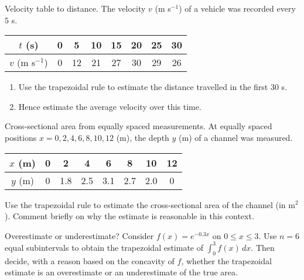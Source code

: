 \documentclass[11pt]{article}
\def\textbf#1{#1}%
\newcounter{question}
\begin{document}
\begin{question}
\textbf{Velocity table to distance.}
The velocity \(v\) (m s\(^{-1}\)) of a vehicle was recorded every \(5\) s.

\begin{center}
\begin{tabular}{c|ccccccc}
\(t\) (s) & 0 & 5 & 10 & 15 & 20 & 25 & 30\\\hline
\(v\) (m s\(^{-1}\)) & 0 & 12 & 21 & 27 & 30 & 29 & 26
\end{tabular}
\end{center}

\begin{enumerate}
  \item Use the trapezoidal rule to estimate the distance travelled in the first \(30\) s.
  \item Hence estimate the average velocity over this time.
\end{enumerate}
\end{question}

\begin{question}
\textbf{Cross-sectional area from equally spaced measurements.}
At equally spaced positions \(x=0,2,4,6,8,10,12\) (m), the depth \(y\) (m) of a channel was measured.

\begin{center}
\begin{tabular}{c|ccccccc}
\(x\) (m) & 0 & 2 & 4 & 6 & 8 & 10 & 12\\\hline
\(y\) (m) & 0 & 1.8 & 2.5 & 3.1 & 2.7 & 2.0 & 0
\end{tabular}
\end{center}

Use the trapezoidal rule to estimate the cross-sectional area of the channel (in m\(^2\)).
Comment briefly on why the estimate is reasonable in this context.
\end{question}

\begin{question}
\textbf{Overestimate or underestimate?}
Consider \(f(x)=e^{-0.3x}\) on \(0\le x\le 3\). Use \(n=6\) equal subintervals to obtain the trapezoidal estimate of
\(\displaystyle \int_{0}^{3} f(x)\,dx\).
Then decide, with a reason based on the concavity of \(f\), whether the trapezoidal estimate is an overestimate or an underestimate of the true area.

\begin{center}
\end{center}
\end{question}
\end{document}
